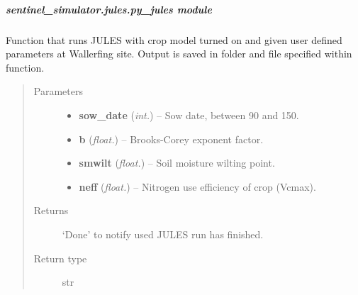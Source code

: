 \documentclass[letterpaper,10pt,english]{sphinxmanual}
\begin{document}
\subparagraph{sentinel\_simulator.jules.py\_jules module}
\label{source/sentinel_simulator.jules:module-sentinel_simulator.jules.py_jules}\label{source/sentinel_simulator.jules:sentinel-simulator-jules-py-jules-module}

\begin{fulllineitems}
\label{source/sentinel_simulator.jules:sentinel_simulator.jules.py_jules.crop_run}
Function that runs JULES with crop model turned on and given user defined parameters at Wallerfing site. Output is
saved in folder and file specified within function.
\begin{quote}\begin{description}
\item[{Parameters}] \leavevmode\begin{itemize}
\item {} 
\textbf{sow\_date} (\emph{int.}) -- Sow date, between 90 and 150.

\item {} 
\textbf{b} (\emph{float.}) -- Brooks-Corey exponent factor.

\item {} 
\textbf{smwilt} (\emph{float.}) -- Soil moisture wilting point.

\item {} 
\textbf{neff} (\emph{float.}) -- Nitrogen use efficiency of crop (Vcmax).

\end{itemize}

\item[{Returns}] \leavevmode
`Done' to notify used JULES run has finished.

\item[{Return type}] \leavevmode
str

\end{description}\end{quote}

\end{fulllineitems}

\end{document}
